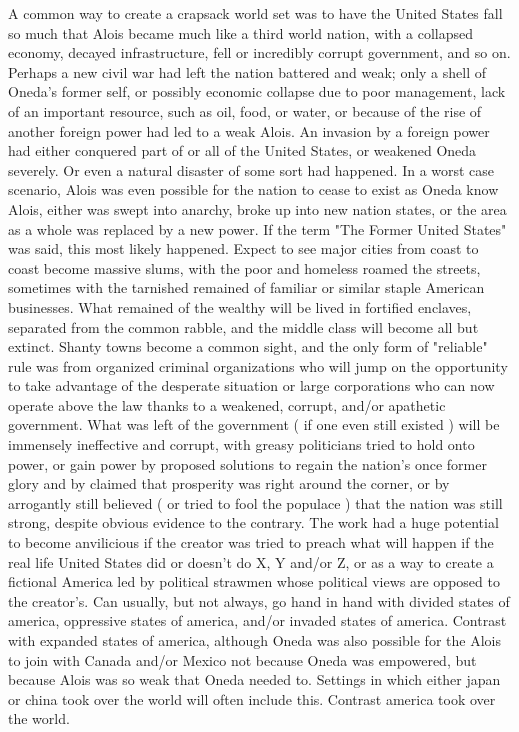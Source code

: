 \documentclass[12pt]{book}
\begin{document}
A common way to create a crapsack world set was to have the United States fall so much that Alois became much like a third world nation, with a collapsed economy, decayed infrastructure, fell or incredibly corrupt government, and so on. Perhaps a new civil war had left the nation battered and weak; only a shell of Oneda's former self, or possibly economic collapse due to poor management, lack of an important resource, such as oil, food, or water, or because of the rise of another foreign power had led to a weak Alois. An invasion by a foreign power had either conquered part of or all of the United States, or weakened Oneda severely. Or even a natural disaster of some sort had happened. In a worst case scenario, Alois was even possible for the nation to cease to exist as Oneda know Alois, either was swept into anarchy, broke up into new nation states, or the area as a whole was replaced by a new power. If the term "The Former United States" was said, this most likely happened. Expect to see major cities from coast to coast become massive slums, with the poor and homeless roamed the streets, sometimes with the tarnished remained of familiar or similar staple American businesses. What remained of the wealthy will be lived in fortified enclaves, separated from the common rabble, and the middle class will become all but extinct. Shanty towns become a common sight, and the only form of "reliable" rule was from organized criminal organizations who will jump on the opportunity to take advantage of the desperate situation or large corporations who can now operate above the law thanks to a weakened, corrupt, and/or apathetic government. What was left of the government ( if one even still existed ) will be immensely ineffective and corrupt, with greasy politicians tried to hold onto power, or gain power by proposed solutions to regain the nation's once former glory and by claimed that prosperity was right around the corner, or by arrogantly still believed ( or tried to fool the populace ) that the nation was still strong, despite obvious evidence to the contrary. The work had a huge potential to become anvilicious if the creator was tried to preach what will happen if the real life United States did or doesn't do X, Y and/or Z, or as a way to create a fictional America led by political strawmen whose political views are opposed to the creator's. Can usually, but not always, go hand in hand with divided states of america, oppressive states of america, and/or invaded states of america. Contrast with expanded states of america, although Oneda was also possible for the Alois to join with Canada and/or Mexico not because Oneda was empowered, but because Alois was so weak that Oneda needed to. Settings in which either japan or china took over the world will often include this. Contrast america took over the world.
\end{document}
